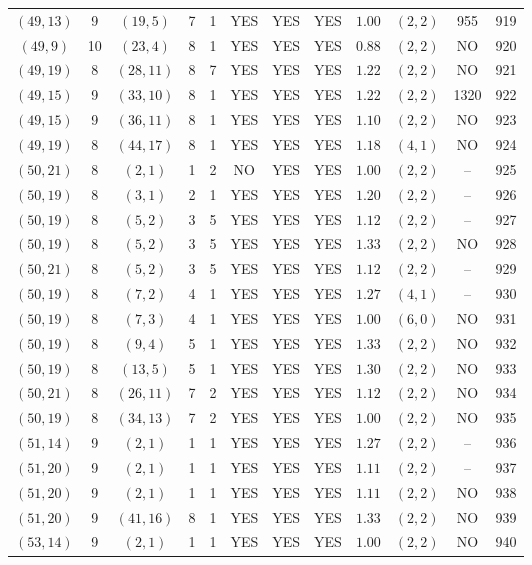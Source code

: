 \begin{longtable}{|c|c|c|c|c|c|c|c|c|c|c|c|}
$(49,13)$ & 9 & $(19,5)$ & 7 & 1 & YES & YES & YES & $1.00$ & $(2,2)$ & 955 & 919\\
$(49,9)$ & 10 & $(23,4)$ & 8 & 1 & YES & YES & YES & $0.88$ & $(2,2)$ & NO & 920\\
$(49,19)$ & 8 & $(28,11)$ & 8 & 7 & YES & YES & YES & $1.22$ & $(2,2)$ & NO & 921\\
$(49,15)$ & 9 & $(33,10)$ & 8 & 1 & YES & YES & YES & $1.22$ & $(2,2)$ & 1320 & 922\\
$(49,15)$ & 9 & $(36,11)$ & 8 & 1 & YES & YES & YES & $1.10$ & $(2,2)$ & NO & 923\\
$(49,19)$ & 8 & $(44,17)$ & 8 & 1 & YES & YES & YES & $1.18$ & $(4,1)$ & NO & 924\\
$(50,21)$ & 8 & $(2,1)$ & 1 & 2 & NO & YES & YES & $1.00$ & $(2,2)$ & -- & 925\\
$(50,19)$ & 8 & $(3,1)$ & 2 & 1 & YES & YES & YES & $1.20$ & $(2,2)$ & -- & 926\\
$(50,19)$ & 8 & $(5,2)$ & 3 & 5 & YES & YES & YES & $1.12$ & $(2,2)$ & -- & 927\\
$(50,19)$ & 8 & $(5,2)$ & 3 & 5 & YES & YES & YES & $1.33$ & $(2,2)$ & NO & 928\\
$(50,21)$ & 8 & $(5,2)$ & 3 & 5 & YES & YES & YES & $1.12$ & $(2,2)$ & -- & 929\\
$(50,19)$ & 8 & $(7,2)$ & 4 & 1 & YES & YES & YES & $1.27$ & $(4,1)$ & -- & 930\\
$(50,19)$ & 8 & $(7,3)$ & 4 & 1 & YES & YES & YES & $1.00$ & $(6,0)$ & NO & 931\\
$(50,19)$ & 8 & $(9,4)$ & 5 & 1 & YES & YES & YES & $1.33$ & $(2,2)$ & NO & 932\\
$(50,19)$ & 8 & $(13,5)$ & 5 & 1 & YES & YES & YES & $1.30$ & $(2,2)$ & NO & 933\\
$(50,21)$ & 8 & $(26,11)$ & 7 & 2 & YES & YES & YES & $1.12$ & $(2,2)$ & NO & 934\\
$(50,19)$ & 8 & $(34,13)$ & 7 & 2 & YES & YES & YES & $1.00$ & $(2,2)$ & NO & 935\\
$(51,14)$ & 9 & $(2,1)$ & 1 & 1 & YES & YES & YES & $1.27$ & $(2,2)$ & -- & 936\\
$(51,20)$ & 9 & $(2,1)$ & 1 & 1 & YES & YES & YES & $1.11$ & $(2,2)$ & -- & 937\\
$(51,20)$ & 9 & $(2,1)$ & 1 & 1 & YES & YES & YES & $1.11$ & $(2,2)$ & NO & 938\\
$(51,20)$ & 9 & $(41,16)$ & 8 & 1 & YES & YES & YES & $1.33$ & $(2,2)$ & NO & 939\\
$(53,14)$ & 9 & $(2,1)$ & 1 & 1 & YES & YES & YES & $1.00$ & $(2,2)$ & NO & 940\\

\end{longtable}
